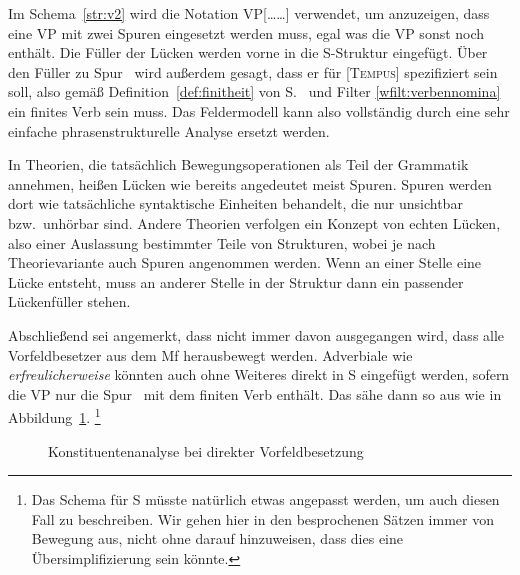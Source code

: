 \newpage


Im Schema~\ref{str:v2} wird die Notation VP[\ldots\Ti\ldots\Tii] verwendet, um anzuzeigen, dass eine VP mit zwei Spuren eingesetzt werden muss, egal was die VP sonst noch enthält.
Die Füller der Lücken werden vorne in die S-Struktur eingefügt.
Über den Füller zu Spur \Ti\ wird außerdem gesagt, dass er für [\textsc{Tempus}] spezifiziert sein soll, also gemäß Definition~\ref{def:finitheit} von S.~\pageref{def:finitheit} und Filter \ref{wfilt:verbennomina} ein finites Verb sein muss.
Das Feldermodell kann also vollständig durch eine sehr einfache phrasenstrukturelle Analyse ersetzt werden.

In Theorien, die tatsächlich Bewegungsoperationen als Teil der Grammatik annehmen, heißen Lücken wie bereits angedeutet meist Spuren.
Spuren werden dort wie tatsächliche syntaktische Einheiten behandelt, die nur unsichtbar bzw.\ unhörbar sind.
Andere Theorien verfolgen ein Konzept von echten Lücken, also einer Auslassung bestimmter Teile von Strukturen, wobei je nach Theorievariante auch Spuren angenommen werden.
Wenn an einer Stelle eine Lücke entsteht, muss an anderer Stelle in der Struktur dann ein passender Lückenfüller stehen.

Abschließend sei angemerkt, dass nicht immer davon ausgegangen wird, dass alle Vorfeldbesetzer aus dem Mf herausbewegt werden.
Adverbiale wie \textit{erfreulicherweise} \zB könnten auch ohne Weiteres direkt in S eingefügt werden, sofern die VP nur die Spur \Ti\ mit dem finiten Verb enthält.
Das sähe dann so aus wie in Abbildung~\ref{fig:vorfelddirektbesetzung}.%
\footnote{Das Schema für S müsste natürlich etwas angepasst werden, um auch diesen Fall zu beschreiben.
Wir gehen hier in den besprochenen Sätzen immer von Bewegung aus, nicht ohne darauf hinzuweisen, dass dies eine Übersimplifizierung sein könnte.}

\begin{figure}[h]
  \centering
  \vspace{0.3cm}
  \caption{Konstituentenanalyse bei direkter Vorfeldbesetzung}
  \label{fig:vorfelddirektbesetzung}
\end{figure}

